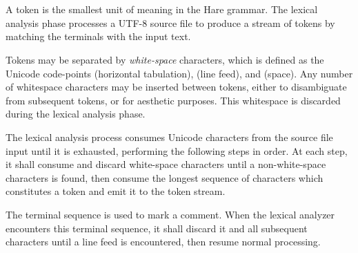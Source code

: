 
\begin{grammar}
\\
	 \\
\end{grammar}

\specsubitem
A token is the smallest unit of meaning in the Hare grammar. The lexical
analysis phase processes a UTF-8 source file to produce a stream of tokens by
matching the terminals with the input text.

\specsubitem
Tokens may be separated by \textit{white-space} characters, which is defined as
the Unicode code-points  (horizontal tabulation), 
(line feed), and  (space). Any number of whitespace characters may
be inserted between tokens, either to disambiguate from subsequent tokens, or
for aesthetic purposes. This whitespace is discarded during the lexical
analysis phase.



\specsubitem
The lexical analysis process consumes Unicode characters from the source file
input until it is exhausted, performing the following steps in order. At each
step, it shall consume and discard white-space characters until a
non-white-space characters is found, then consume the longest sequence of
characters which constitutes a token and emit it to the token stream.

\specsubitem
The terminal sequence \terminal{//} is used to mark a comment. When the lexical
analyzer encounters this terminal sequence, it shall discard it and all
subsequent characters until a line feed  is encountered, then
resume normal processing.
